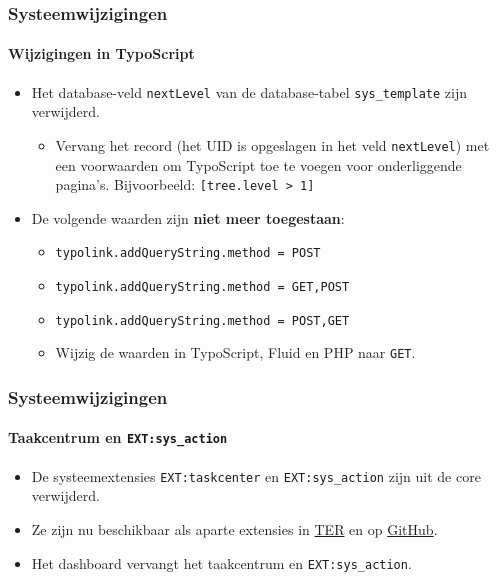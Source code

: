 \begin{frame}[fragile]
	\frametitle{Systeemwijzigingen}
	\framesubtitle{Wijzigingen in TypoScript}

	\begin{itemize}
		\item Het database-veld \texttt{nextLevel} van de database-tabel
			\texttt{sys\_template} zijn verwijderd.

			\begin{itemize}\smaller
				\item[\ding{228}] Vervang het record (het UID is opgeslagen in het veld \texttt{nextLevel}) met een voorwaarden om TypoScript toe te voegen voor onderliggende pagina's. Bijvoorbeeld: \texttt{[tree.level > 1]}
			\end{itemize}\normalsize

		\item De volgende waarden zijn \textbf{niet meer toegestaan}:

			\begin{itemize}\smaller
				\item \texttt{typolink.addQueryString.method = POST}
				\item \texttt{typolink.addQueryString.method = GET,POST}
				\item \texttt{typolink.addQueryString.method = POST,GET}
			\end{itemize}\normalsize

			\begin{itemize}\smaller
				\item[\ding{228}] Wijzig de waarden in TypoScript, Fluid en PHP naar \texttt{GET}.
			\end{itemize}\normalsize

	\end{itemize}

\end{frame}


\begin{frame}[fragile]
	\frametitle{Systeemwijzigingen}
	\framesubtitle{Taakcentrum en \texttt{EXT:sys\_action}}

	\begin{itemize}

		\item De systeemextensies \texttt{EXT:taskcenter} en \texttt{EXT:sys\_action}
			zijn uit de core verwijderd.

		\item Ze zijn nu beschikbaar als aparte extensies in
			\href{https://extensions.typo3.org/}{TER}
			en op
			\href{https://github.com/FriendsOfTYPO3}{GitHub}.

		\item Het dashboard vervangt het taakcentrum en \texttt{EXT:sys\_action}.

	\end{itemize}

\end{frame}

